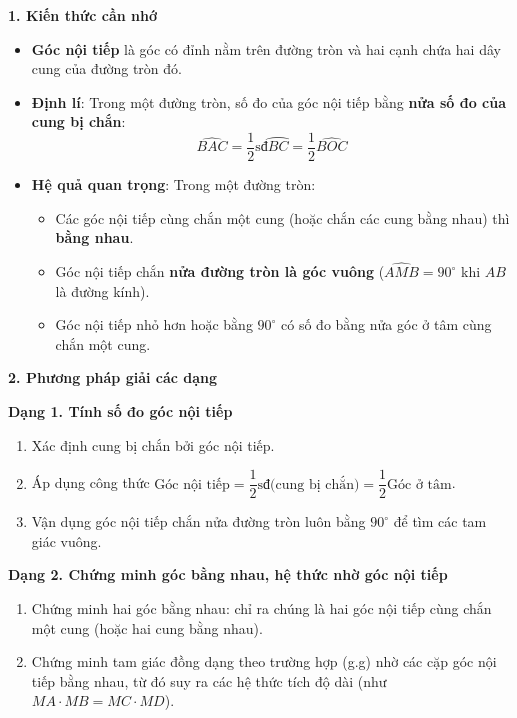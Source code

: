 \textbf{1. Kiến thức cần nhớ}
\begin{itemize}
\item \textbf{Góc nội tiếp} là góc có đỉnh nằm trên đường tròn và hai cạnh chứa hai dây cung của đường tròn đó.
\item \textbf{Định lí}: Trong một đường tròn, số đo của góc nội tiếp bằng \textbf{nửa số đo của cung bị chắn}:
$$\boxed{\widehat{BAC} = \dfrac{1}{2}\text{sđ}\wideparen{BC} = \dfrac{1}{2}\widehat{BOC}}$$
\item \textbf{Hệ quả quan trọng}: Trong một đường tròn:
\begin{itemize}
\item Các góc nội tiếp cùng chắn một cung (hoặc chắn các cung bằng nhau) thì \textbf{bằng nhau}.
\item Góc nội tiếp chắn \textbf{nửa đường tròn là góc vuông} ($\widehat{AMB} = 90^\circ$ khi $AB$ là đường kính).
\item Góc nội tiếp nhỏ hơn hoặc bằng $90^\circ$ có số đo bằng nửa góc ở tâm cùng chắn một cung.
\end{itemize}
\end{itemize}

\textbf{2. Phương pháp giải các dạng}

\textbf{Dạng 1. Tính số đo góc nội tiếp}
\begin{enumerate}
\item Xác định cung bị chắn bởi góc nội tiếp.
\item Áp dụng công thức $\text{Góc nội tiếp} = \dfrac{1}{2}\text{sđ(cung bị chắn)} = \dfrac{1}{2}\text{Góc ở tâm}$.
\item Vận dụng góc nội tiếp chắn nửa đường tròn luôn bằng $90^\circ$ để tìm các tam giác vuông.
\end{enumerate}

\textbf{Dạng 2. Chứng minh góc bằng nhau, hệ thức nhờ góc nội tiếp}
\begin{enumerate}
\item Chứng minh hai góc bằng nhau: chỉ ra chúng là hai góc nội tiếp cùng chắn một cung (hoặc hai cung bằng nhau).
\item Chứng minh tam giác đồng dạng theo trường hợp (g.g) nhờ các cặp góc nội tiếp bằng nhau, từ đó suy ra các hệ thức tích độ dài (như $MA \cdot MB = MC \cdot MD$).
\end{enumerate}
